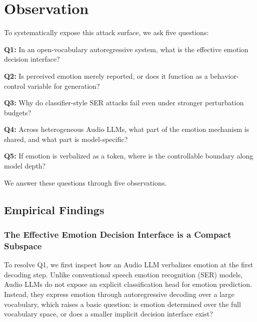 \section{Observation}
\label{observation}
\label{sec:Observation}

To systematically expose this attack surface, we ask five questions:
\begin{packeditemize}
    \item \textbf{Q1:} In an open-vocabulary autoregressive system, what is the effective emotion decision interface?
    \item \textbf{Q2:} Is perceived emotion merely reported, or does it function as a behavior-control variable for generation?
    \item \textbf{Q3:} Why do classifier-style SER attacks fail even under stronger perturbation budgets?
    \item \textbf{Q4:} Across heterogeneous Audio LLMs, what part of the emotion mechanism is shared, and what part is model-specific?
    \item \textbf{Q5:} If emotion is verbalized as a token, where is the controllable boundary along model depth?
\end{packeditemize}

We answer these questions through five observations.

\subsection{Empirical Findings}
\label{sec:obs_empirical_findings}
\label{sec:obs-allm-universal}
\label{sec:clean-emotion-observation}


\subsubsection{The Effective Emotion Decision Interface is a Compact Subspace}
\label{sec:obs_q1}

To resolve Q1, we first inspect how an Audio LLM verbalizes emotion at the first decoding step.
Unlike conventional speech emotion recognition (SER) models, Audio LLMs do not expose an explicit classification head for emotion prediction.
Instead, they express emotion through autoregressive decoding over a large vocabulary, which raises a basic question: is emotion determined over the full vocabulary space, or does a smaller implicit decision interface exist?

